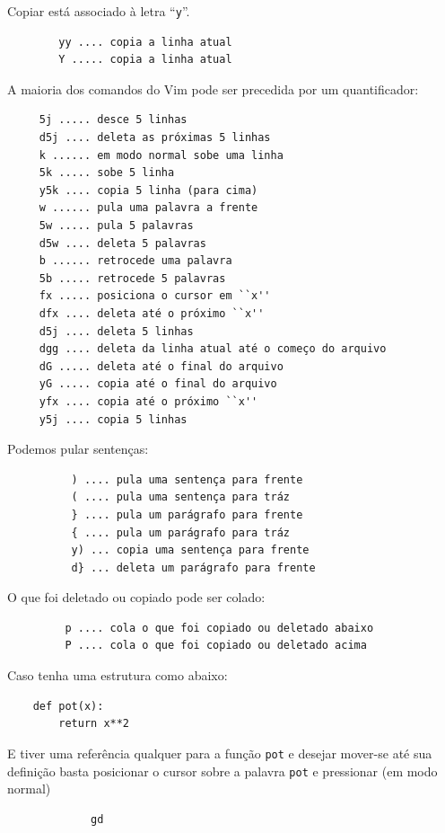 \documentclass[10pt,a4paper,openany]{book}
\begin{document}
Copiar está associado à letra ``\verb|y|''.

\begin{verbatim}
		yy .... copia a linha atual
		Y ..... copia a linha atual
\end{verbatim}

A maioria dos comandos do Vim pode ser precedida por um quantificador:

\begin{verbatim}
	 5j ..... desce 5 linhas
	 d5j .... deleta as próximas 5 linhas
	 k ...... em modo normal sobe uma linha
	 5k ..... sobe 5 linha
	 y5k .... copia 5 linha (para cima)
	 w ...... pula uma palavra a frente
	 5w ..... pula 5 palavras
	 d5w .... deleta 5 palavras
	 b ...... retrocede uma palavra
	 5b ..... retrocede 5 palavras
	 fx ..... posiciona o cursor em ``x''
	 dfx .... deleta até o próximo ``x''
	 d5j .... deleta 5 linhas
	 dgg .... deleta da linha atual até o começo do arquivo
	 dG ..... deleta até o final do arquivo
	 yG ..... copia até o final do arquivo
	 yfx .... copia até o próximo ``x''
	 y5j .... copia 5 linhas
\end{verbatim}

Podemos pular sentenças:

\begin{verbatim}
		  ) .... pula uma sentença para frente
		  ( .... pula uma sentença para tráz
		  } .... pula um parágrafo para frente
		  { .... pula um parágrafo para tráz
		  y) ... copia uma sentença para frente
		  d} ... deleta um parágrafo para frente
\end{verbatim}

O que foi deletado ou copiado pode ser colado:

\begin{verbatim}
		 p .... cola o que foi copiado ou deletado abaixo
		 P .... cola o que foi copiado ou deletado acima
\end{verbatim}

Caso tenha uma estrutura como abaixo:

\begin{verbatim}
	def pot(x):
		return x**2
\end{verbatim}

E tiver uma referência qualquer para a função \verb+pot+ e desejar
mover-se até sua definição basta posicionar o cursor sobre a palavra
\verb+pot+ e pressionar (em modo normal)

\begin{verbatim}
			 gd
\end{verbatim}
\end{document}
